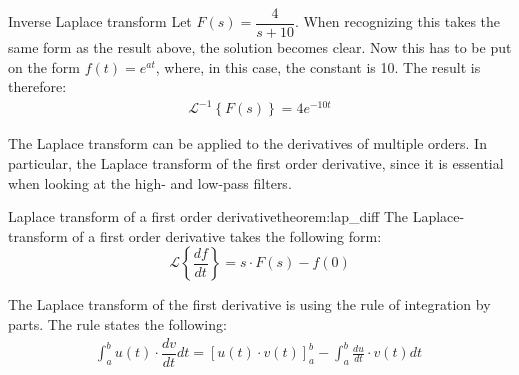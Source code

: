 \begin{example}{Inverse Laplace transform}{}
Let $F(s) = \dfrac{4}{s+10}$. When recognizing this takes the same form as the result above, the solution becomes clear. Now this has to be put on the form $f(t)=e^{at}$, where, in this case, the constant is 10. The result is therefore:
\begin{align*}
\mathcal{L}^{-1} \left\{F(s) \right\} = 4e^{-10t}
\end{align*}
\end{example}
\noindent The Laplace transform can be applied to the derivatives of multiple orders. In particular, the Laplace transform of the first order derivative, since it is essential when looking at the high- and low-pass filters.
\begin{theorem}{Laplace transform of a first order derivative}{theorem:lap_diff}
The Laplace-transform of a first order derivative takes the following form:
$$\mathcal{L} \left\{\frac{df}{dt} \right\} = s \cdot F(s)-f(0)$$
\end{theorem}
\noindent The Laplace transform of the first derivative is using the rule of integration by parts. The rule states the following:
\begin{align}
\int_{a}^{b}{u(t) \cdot \dfrac{dv}{dt}dt}=\left[u(t) \cdot v(t) \right]_{a}^{b}-\int_{a}^{b} \frac{du}{dt}\cdot v(t) dt\
\label{eq:intbyparts}
\end{align}
